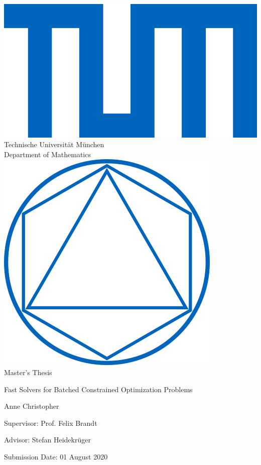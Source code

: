 \documentclass[12pt,a4paper,twoside]{report}
\begin{document}
\pagestyle{empty}
\begin{titlepage}
\begin{center}
\includegraphics[scale=0.15]{TUMlschwarz.png}\\[5mm]
\sf
{\LARGE
  Technische Universit\"at M\"unchen\\[5mm]
  Department of Mathematics\\[8mm]
}
\normalsize
\includegraphics[scale=0.15]{TUMlMschwarz.png}\\[10mm]

{\Large Master's Thesis\\[10mm]}

{\Huge
  Fast Solvers for Batched Constrained Optimization Problems \\[5mm]\par
}
\bigskip

\normalsize

{\Large Anne Christopher}
\end{center}
\vspace*{60mm}

{\Large
\centering
Supervisor: Prof. Felix Brandt
\medskip

Advisor: Stefan Heidekr\"uger
\medskip

Submission Date: 01 August 2020 \par
}
\end{titlepage}
\end{document}
